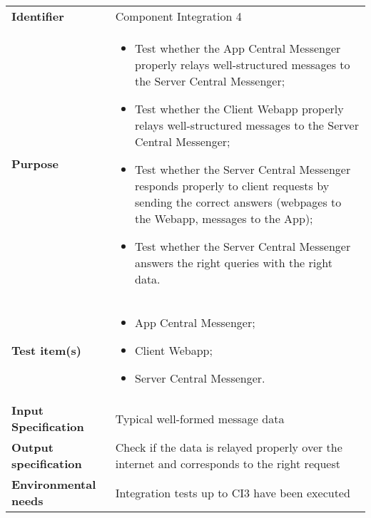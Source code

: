 \begin{center}
\begin{tabular}{lp{}}
\toprule
\textbf{Identifier}		&	Component Integration 4\\
\textbf{Purpose}		&	\begin{itemize}
					\item Test whether the App Central Messenger properly relays well-structured messages to the Server Central Messenger;
					\item Test whether the Client Webapp properly relays well-structured messages to the Server Central Messenger;
					\item Test whether the Server Central Messenger responds properly to client requests by sending the correct answers (webpages to the Webapp, messages to the App);
					\item Test whether the Server Central Messenger answers the right queries with the right data.
					\end{itemize}	\\
\textbf{Test item(s)}	&	\begin{itemize}
					\item App Central Messenger;
					\item Client Webapp;
					\item Server Central Messenger.
					\end{itemize}	\\
\textbf{Input Specification}	&	Typical well-formed message data\\
\textbf{Output specification}	&	Check if the data is relayed properly over the internet and corresponds to the right request\\
\textbf{Environmental needs}	&	Integration tests up to CI3 have been executed\\
\bottomrule
\end{tabular}
\end{center}

